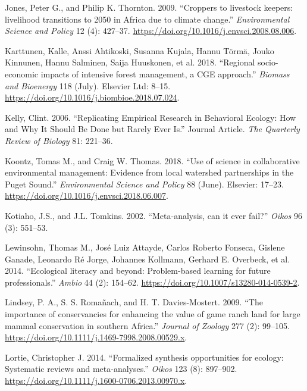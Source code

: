 \documentclass[fleqn,10pt]{wlpeerj} %
\begin{document}
\leavevmode\hypertarget{ref-Jones2009}{}%
Jones, Peter G., and Philip K. Thornton. 2009. ``Croppers to livestock
keepers: livelihood transitions to 2050 in Africa due to climate
change.'' \emph{Environmental Science and Policy} 12 (4): 427--37.
\url{https://doi.org/10.1016/j.envsci.2008.08.006}.

\leavevmode\hypertarget{ref-Karttunen2018}{}%
Karttunen, Kalle, Anssi Ahtikoski, Susanna Kujala, Hannu Törmä, Jouko
Kinnunen, Hannu Salminen, Saija Huuskonen, et al. 2018. ``Regional
socio-economic impacts of intensive forest management, a CGE approach.''
\emph{Biomass and Bioenergy} 118 (July). Elsevier Ltd: 8--15.
\url{https://doi.org/10.1016/j.biombioe.2018.07.024}.

\leavevmode\hypertarget{ref-Kelly2006}{}%
Kelly, Clint. 2006. ``Replicating Empirical Research in Behavioral
Ecology: How and Why It Should Be Done but Rarely Ever Is.'' Journal
Article. \emph{The Quarterly Review of Biology} 81: 221--36.

\leavevmode\hypertarget{ref-Koontz2018}{}%
Koontz, Tomas M., and Craig W. Thomas. 2018. ``Use of science in
collaborative environmental management: Evidence from local watershed
partnerships in the Puget Sound.'' \emph{Environmental Science and
Policy} 88 (June). Elsevier: 17--23.
\url{https://doi.org/10.1016/j.envsci.2018.06.007}.

\leavevmode\hypertarget{ref-Kotiaho2002}{}%
Kotiaho, J.S., and J.L. Tomkins. 2002. ``Meta-analysis, can it ever
fail?'' \emph{Oikos} 96 (3): 551--53.

\leavevmode\hypertarget{ref-Lewinsohn2014}{}%
Lewinsohn, Thomas M., José Luiz Attayde, Carlos Roberto Fonseca, Gislene
Ganade, Leonardo Ré Jorge, Johannes Kollmann, Gerhard E. Overbeck, et
al. 2014. ``Ecological literacy and beyond: Problem-based learning for
future professionals.'' \emph{Ambio} 44 (2): 154--62.
\url{https://doi.org/10.1007/s13280-014-0539-2}.

\leavevmode\hypertarget{ref-Lindsey2009}{}%
Lindsey, P. A., S. S. Romañach, and H. T. Davies-Mostert. 2009. ``The
importance of conservancies for enhancing the value of game ranch land
for large mammal conservation in southern Africa.'' \emph{Journal of
Zoology} 277 (2): 99--105.
\url{https://doi.org/10.1111/j.1469-7998.2008.00529.x}.

\leavevmode\hypertarget{ref-Lortie2014}{}%
Lortie, Christopher J. 2014. ``Formalized synthesis opportunities for
ecology: Systematic reviews and meta-analyses.'' \emph{Oikos} 123 (8):
897--902. \url{https://doi.org/10.1111/j.1600-0706.2013.00970.x}.
\end{document}
